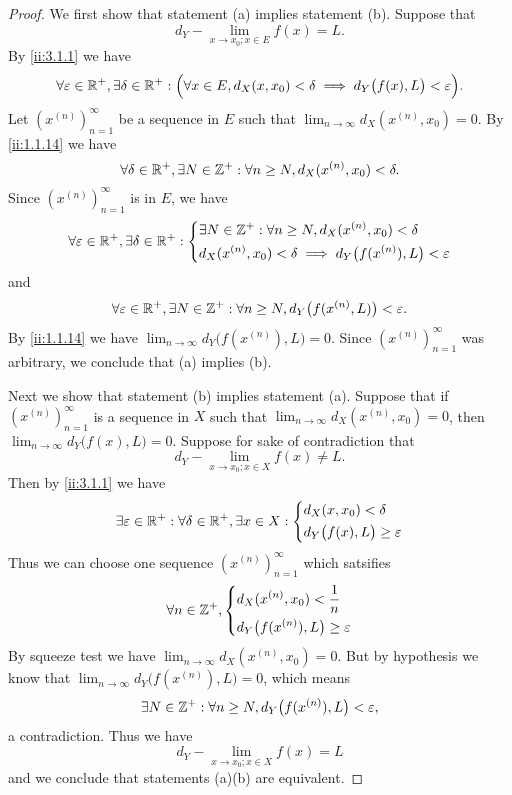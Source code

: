 \begin{proof}
  We first show that statement (a) implies statement (b).
  Suppose that
  \[
    d_Y - \lim_{x \to x_0 ; x \in E} f(x) = L.
  \]
  By \cref{ii:3.1.1} we have
  \[
    \forall \varepsilon \in \mathbb{R}^+, \exists \delta \in \mathbb{R}^+ : \Big(\forall x \in E, d_X(x, x_0) < \delta \implies d_Y\big(f(x), L\big) < \varepsilon\Big).
  \]
  Let \((x^{(n)})_{n = 1}^\infty\) be a sequence in \(E\) such that \(\lim_{n \to \infty} d_X(x^{(n)}, x_0) = 0\).
  By \cref{ii:1.1.14} we have
  \[
    \forall \delta \in \mathbb{R}^+, \exists N \in \mathbb{Z}^+ : \forall n \geq N, d_X(x^{(n)}, x_0) < \delta.
  \]
  Since \((x^{(n)})_{n = 1}^\infty\) is in \(E\), we have
  \[
    \forall \varepsilon \in \mathbb{R}^+, \exists \delta \in \mathbb{R}^+ : \begin{dcases}
      \exists N \in \mathbb{Z}^+ : \forall n \geq N, d_X(x^{(n)}, x_0) < \delta \\
      d_X(x^{(n)}, x_0) < \delta \implies d_Y\big(f(x^{(n)}), L\big) < \varepsilon
    \end{dcases}
  \]
  and
  \[
    \forall \varepsilon \in \mathbb{R}^+, \exists N \in \mathbb{Z}^+ : \forall n \geq N, d_Y\big(f(x^{(n)}, L)\big) < \varepsilon.
  \]
  By \cref{ii:1.1.14} we have \(\lim_{n \to \infty} d_Y\big(f(x^{(n)}), L\big) = 0\).
  Since \((x^{(n)})_{n = 1}^\infty\) was arbitrary, we conclude that (a) implies (b).

  Next we show that statement (b) implies statement (a).
  Suppose that if \((x^{(n)})_{n = 1}^\infty\) is a sequence in \(X\) such that \(\lim_{n \to \infty} d_X(x^{(n)}, x_0) = 0\), then \(\lim_{n \to \infty} d_Y\big(f(x), L\big) = 0\).
  Suppose for sake of contradiction that
  \[
    d_Y - \lim_{x \to x_0 ; x \in X} f(x) \neq L.
  \]
  Then by \cref{ii:3.1.1} we have
  \[
    \exists \varepsilon \in \mathbb{R}^+ : \forall \delta \in \mathbb{R}^+, \exists x \in X : \begin{dcases}
      d_X(x, x_0) < \delta \\
      d_Y\big(f(x), L\big) \geq \varepsilon
    \end{dcases}
  \]
  Thus we can choose one sequence \((x^{(n)})_{n = 1}^\infty\) which satsifies
  \[
    \forall n \in \mathbb{Z}^+, \begin{dcases}
      d_X(x^{(n)}, x_0) < \dfrac{1}{n} \\
      d_Y\big(f(x^{(n)}), L\big) \geq \varepsilon
    \end{dcases}
  \]
  By squeeze test we have \(\lim_{n \to \infty} d_X(x^{(n)}, x_0) = 0\).
  But by hypothesis we know that \(\lim_{n \to \infty} d_Y\big(f(x^{(n)}), L\big) = 0\), which means
  \[
    \exists N \in \mathbb{Z}^+ : \forall n \geq N, d_Y\big(f(x^{(n)}), L\big) < \varepsilon,
  \]
  a contradiction.
  Thus we have
  \[
    d_Y - \lim_{x \to x_0 ; x \in X} f(x) = L
  \]
  and we conclude that statements (a)(b) are equivalent.


\end{proof}
